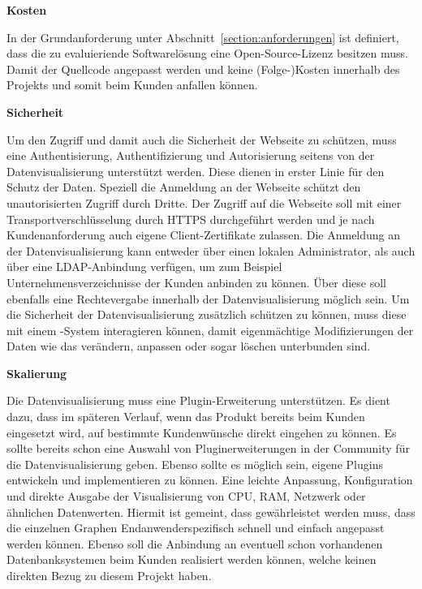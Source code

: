 \textbf{Kosten}
\begin{outline}
  \1 In der Grundanforderung unter Abschnitt~\ref{section:anforderungen} ist
  definiert, dass die zu evaluieriende Softwarelösung eine
  Open\hyp{}Source\hyp{}Lizenz besitzen muss. Damit der Quellcode angepasst
  werden und keine (Folge\hyp{})Kosten innerhalb des Projekts und somit beim
  Kunden anfallen können.
\end{outline}

\textbf{Sicherheit}
\begin{outline}
  \1 Um den Zugriff und damit auch die Sicherheit der Webseite zu
  schützen, muss eine Authentisierung, Authentifizierung und Autorisierung
  seitens von der Datenvisualisierung unterstützt werden. Diese dienen in
  erster Linie für den Schutz der Daten. Speziell die Anmeldung an der Webseite
  schützt den unautorisierten Zugriff durch Dritte. Der Zugriff auf die
  Webseite soll mit einer Transportverschlüsselung durch \gls{HTTPS}
  durchgeführt werden und je nach Kundenanforderung auch eigene
  Client\hyp{}Zertifikate zulassen. Die Anmeldung an der Datenvisualisierung
  kann entweder über einen lokalen Administrator, als auch über eine
  \gls{LDAP}\hyp{}Anbindung verfügen, um zum Beispiel Unternehmensverzeichnisse
  der Kunden anbinden zu können. Über diese soll ebenfalls eine Rechtevergabe
  innerhalb der Datenvisualisierung möglich sein.
  \1 Um die Sicherheit der Datenvisualisierung zusätzlich schützen zu können,
  muss diese mit einem \hyp{}System interagieren können, damit
  eigenmächtige Modifizierungen der Daten wie das verändern, anpassen oder
  sogar löschen unterbunden sind.
\end{outline}

\textbf{Skalierung}
\begin{outline}
  \1 Die Datenvisualisierung muss eine Plugin\hyp{}Erweiterung unterstützen. Es
  dient dazu, dass im späteren Verlauf, wenn das Produkt bereits beim Kunden
  eingesetzt wird, auf bestimmte Kundenwünsche direkt eingehen zu können. Es
  sollte bereits schon eine Auswahl von Pluginerweiterungen in der Community
  für die Datenvisualisierung geben. Ebenso sollte es möglich sein, eigene
  Plugins entwickeln und implementieren zu können.
  \1 Eine leichte Anpassung, Konfiguration und direkte Ausgabe der
  Visualisierung von CPU, RAM, Netzwerk oder ähnlichen Datenwerten. Hiermit ist
  gemeint, dass gewährleistet werden muss, dass die einzelnen Graphen
  Endanwenderspezifisch schnell und einfach angepasst werden können. Ebenso
  soll die Anbindung an eventuell schon vorhandenen Datenbanksystemen beim
  Kunden realisiert werden können, welche keinen direkten Bezug zu diesem
  Projekt haben.
\end{outline}

